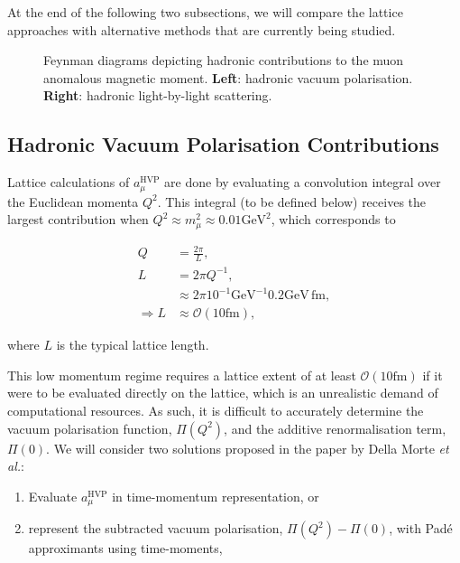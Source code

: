 \documentclass{article}
\numberwithin{equation}{section} %
\begin{document}
At the end of the following two subsections, we will compare the lattice approaches with alternative methods that are currently being studied.


\begin{figure}[t]
    \centering
    \qquad
    \caption{Feynman diagrams depicting hadronic contributions to the muon anomalous magnetic moment. \textbf{Left}: hadronic vacuum polarisation. \textbf{Right}: hadronic light-by-light scattering.}%
    \label{hadfeynman}%
\end{figure}


\subsection{Hadronic Vacuum Polarisation Contributions}\label{hvp}

Lattice calculations of $a_\mu^\mathrm{HVP}$ are done by evaluating a convolution integral over the Euclidean momenta $Q^2$. This integral (to be defined below) receives the largest contribution when $Q^2\approx m_\mu^2\approx 0.01\mathrm{GeV}^2$, which corresponds to 

\begin{equation}
\begin{split}
Q &= \frac{2\pi}{L},\\
L &= 2\pi Q^{-1},\\
&\approx 2\pi 10^{-1} \mathrm{GeV}^{-1} 0.2 \mathrm{GeV \, fm},\\
\Rightarrow L &\approx \mathcal{O}(10\mathrm{fm}), 
\end{split}
\end{equation}

\noindent where $L$ is the typical lattice length\cite{dellamorte}.

This low momentum regime requires a lattice extent of at least $\mathcal{O}(10\mathrm{fm})$ if it were to be evaluated directly on the lattice, which is an unrealistic demand of computational resources. As such, it is difficult to accurately determine the vacuum polarisation function, $\Pi(Q^2)$, and the additive renormalisation term, $\Pi(0)$. We will consider two solutions proposed in the paper by Della Morte \textit{et al.}\cite{dellamorte}: 


\begin{enumerate}
\item Evaluate $a_\mu^\mathrm{HVP}$ in time-momentum representation, or
\item represent the subtracted vacuum polarisation, $\Pi(Q^2)-\Pi(0)$, with Pad\'{e} approximants using time-moments,
\end{enumerate}
\end{document}
